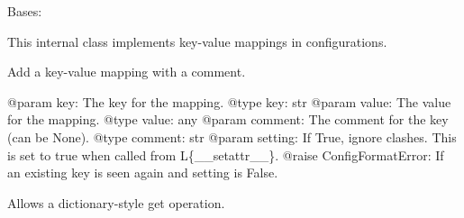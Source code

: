 \documentclass[a4paper,10pt,english]{sphinxmanual}
\begin{document}
\begin{fulllineitems}
\label{commands/apidoc/src:src.pyconf.Mapping}
Bases: {\hyperref[commands/apidoc/src:src.pyconf.Container]{}}

This internal class implements key-value mappings in configurations.

\begin{fulllineitems}
\label{commands/apidoc/src:src.pyconf.Mapping.addMapping}
Add a key-value mapping with a comment.

@param key: The key for the mapping.
@type key: str
@param value: The value for the mapping.
@type value: any
@param comment: The comment for the key (can be None).
@type comment: str
@param setting: If True, ignore clashes. This is set
to true when called from L\{\_\_setattr\_\_\}.
@raise ConfigFormatError: If an existing key is seen
again and setting is False.

\end{fulllineitems}


\begin{fulllineitems}
\label{commands/apidoc/src:src.pyconf.Mapping.get}
Allows a dictionary-style get operation.

\end{fulllineitems}


\begin{fulllineitems}
\label{commands/apidoc/src:src.pyconf.Mapping.iteritems}
\end{fulllineitems}


\begin{fulllineitems}
\label{commands/apidoc/src:src.pyconf.Mapping.iterkeys}
\end{fulllineitems}



\end{fulllineitems}
\end{document}
